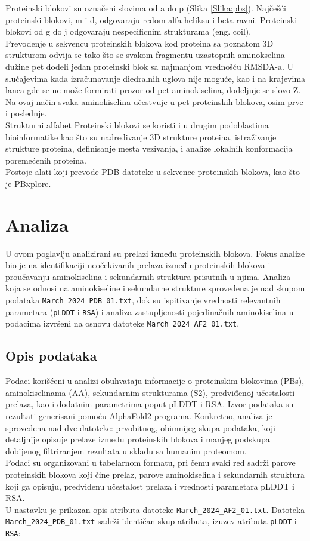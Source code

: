\documentclass[a4paper,12pt]{article}
\begin{document}
\newpage
Proteinski blokovi su označeni slovima od a do p (Slika \ref{Slika:pbs}). Najčešći proteinski blokovi, m i d, odgovaraju redom alfa-heliksu i beta-ravni. Proteinski blokovi od g do j odgovaraju nespecificnim strukturama (eng. coil). \\
Prevođenje u sekvencu proteinskih blokova kod proteina sa poznatom 3D strukturom odvija se tako što se svakom fragmentu uzastopnih aminokselina dužine pet dodeli jedan proteinski blok sa najmanjom vrednošću RMSDA-a. U slučajevima kada izračunavanje diedralnih uglova nije moguće, kao i na krajevima lanca gde se ne može formirati prozor od pet aminokiselina, dodeljuje se slovo Z. Na ovaj način svaka aminokiselina učestvuje u pet proteinskih blokova, osim prve i poslednje. \\
Strukturni alfabet Proteinski blokovi se koristi i u drugim podoblastima bioinformatike kao što su nadređivanje 3D strukture proteina, istraživanje strukture proteina, definisanje mesta vezivanja, i analize lokalnih konformacija poremećenih proteina. \\
Postoje alati koji prevode PDB datoteke u sekvence proteinskih blokova, kao što je PBxplore.
\newpage
\section{Analiza}
U ovom poglavlju analizirani su prelazi između proteinskih blokova. Fokus analize bio je na identifikaciji neočekivanih prelaza između proteinskih blokova i proučavanju aminokiselina i sekundarnih struktura prisutnih u njima. Analiza koja se odnosi na aminokiseline i sekundarne strukture sprovedena je nad skupom podataka \texttt{March\_2024\_PDB\_01.txt}, dok su ispitivanje vrednosti relevantnih parametara (\texttt{pLDDT} i \texttt{RSA}) i analiza zastupljenosti pojedinačnih aminokiselina u podacima izvršeni na osnovu datoteke \texttt{March\_2024\_AF2\_01.txt}.

\subsection{Opis podataka}
Podaci korišćeni u analizi obuhvataju informacije o proteinskim blokovima (PBs), aminokiselinama (AA), sekundarnim strukturama (S2), predviđenoj učestalosti prelaza, kao i dodatnim parametrima poput pLDDT i RSA. Izvor podataka su rezultati generisani pomoću AlphaFold2 programa. Konkretno, analiza je sprovedena nad dve datoteke: prvobitnog, obimnijeg skupa podataka, koji detaljnije opisuje prelaze između proteinskih blokova i manjeg podskupa dobijenog filtriranjem rezultata u skladu sa humanim proteomom. \\
Podaci su organizovani u tabelarnom formatu, pri čemu svaki red sadrži parove proteinskih blokova koji čine prelaz, parove aminokiselina i sekundarnih struktura koji ga opisuju, predviđenu učestalost prelaza i vrednosti parametara pLDDT i RSA.
\\
U nastavku je prikazan opis atributa datoteke \texttt{March\_2024\_AF2\_01.txt}.  
Datoteka \texttt{March\_2024\_PDB\_01.txt} sadrži identičan skup atributa, izuzev atributa \texttt{pLDDT} i \texttt{RSA}:
\end{document}

